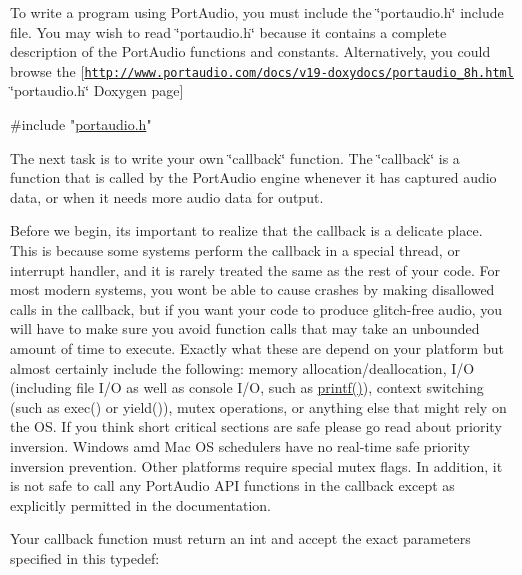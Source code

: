 To write a program using Port\+Audio, you must include the \char`\"{}portaudio.\+h\char`\"{} include file. You may wish to read \char`\"{}portaudio.\+h\char`\"{} because it contains a complete description of the Port\+Audio functions and constants. Alternatively, you could browse the \mbox{[}\href{http://www.portaudio.com/docs/v19-doxydocs/portaudio_8h.html}{\tt http\+://www.\+portaudio.\+com/docs/v19-\/doxydocs/portaudio\+\_\+8h.\+html} \char`\"{}portaudio.\+h\char`\"{} Doxygen page\mbox{]} 
\begin{DoxyCode}
\textcolor{preprocessor}{#include "\hyperlink{portaudio_8h}{portaudio.h}"}
\end{DoxyCode}
 The next task is to write your own \char`\"{}callback\char`\"{} function. The \char`\"{}callback\char`\"{} is a function that is called by the Port\+Audio engine whenever it has captured audio data, or when it needs more audio data for output.

Before we begin, it\textquotesingle{}s important to realize that the callback is a delicate place. This is because some systems perform the callback in a special thread, or interrupt handler, and it is rarely treated the same as the rest of your code. For most modern systems, you won\textquotesingle{}t be able to cause crashes by making disallowed calls in the callback, but if you want your code to produce glitch-\/free audio, you will have to make sure you avoid function calls that may take an unbounded amount of time to execute. Exactly what these are depend on your platform but almost certainly include the following\+: memory allocation/deallocation, I/O (including file I/O as well as console I/O, such as \hyperlink{octave__test_8m_ac6d0e62c65e5715b13a5fcb381118888}{printf()}), context switching (such as exec() or yield()), mutex operations, or anything else that might rely on the OS. If you think short critical sections are safe please go read about priority inversion. Windows amd Mac OS schedulers have no real-\/time safe priority inversion prevention. Other platforms require special mutex flags. In addition, it is not safe to call any Port\+Audio A\+PI functions in the callback except as explicitly permitted in the documentation.

Your callback function must return an int and accept the exact parameters specified in this typedef\+:


